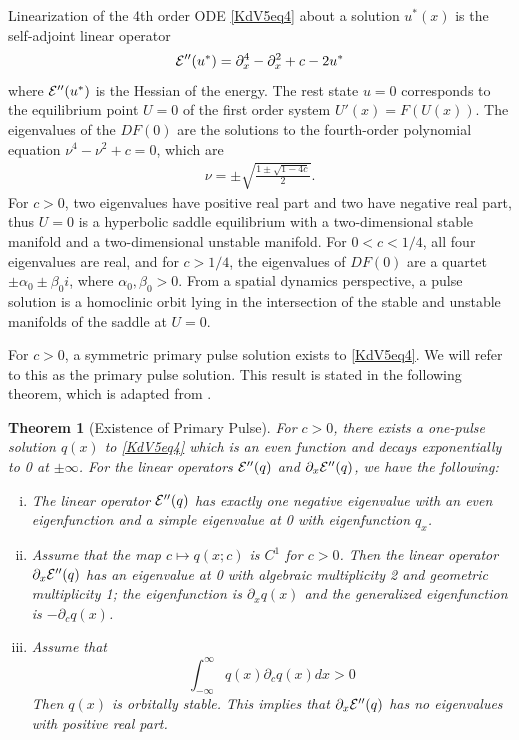 \documentclass[11pt,reqno]{amsart}
\theoremstyle{plain}
\newtheorem{theorem}{Theorem}
\theoremstyle{definition}
\theoremstyle{remark}
\begin{document}
Linearization of the 4th order ODE \cref{KdV5eq4} about a solution $u^*(x)$ is the self-adjoint linear operator
\begin{equation}\label{KdV5hessian}
\mathcal{E}''(u^*) = \partial_x^4 - \partial_x^2 + c - 2 u^* 
\end{equation}
where $\mathcal{E}''(u^*)$ is the Hessian of the energy. The rest state $u = 0$ corresponds to the equilibrium point $U = 0$ of the first order system $U'(x) = F(U(x))$. The eigenvalues of the $DF(0)$ are the solutions to the fourth-order polynomial equation $\nu^4 - \nu^2 + c = 0$, which are
\begin{align}
\nu = \pm \sqrt{ \frac{1 \pm \sqrt{1 - 4c} }{2}}.
\end{align}
For $c > 0$, two eigenvalues have positive real part and two have negative real part, thus $U = 0$ is a hyperbolic saddle equilibrium with a two-dimensional stable manifold and a two-dimensional unstable manifold. For $0 < c < 1/4$, all four eigenvalues are real, and for $c > 1/4$, the eigenvalues of $DF(0)$ are a quartet $\pm \alpha_0 \pm \beta_0 i$, where $\alpha_0, \beta_0 > 0$. From a spatial dynamics perspective, a pulse solution is a homoclinic orbit lying in the intersection of the stable and unstable manifolds of the saddle at $U = 0$.

For $c > 0$, a symmetric primary pulse solution exists to \cref{KdV5eq4}. We will refer to this as the primary pulse solution. This result is stated in the following theorem, which is adapted from \cite[Theorem 2.1]{Pelinovsky2007}.

\begin{theorem}[Existence of Primary Pulse]\label{KdV1pulse}
For $c > 0$, there exists a one-pulse solution $q(x)$ to \cref{KdV5eq4} which is an even function and decays exponentially to 0 at $\pm \infty$. For the linear operators $\mathcal{E}''(q)$ and $\partial_x \mathcal{E}''(q)$, we have the following:
\begin{enumerate}[(i)]
\item The linear operator $\mathcal{E}''(q)$ has exactly one negative eigenvalue with an even eigenfunction and a simple eigenvalue at 0 with eigenfunction $q_x$.
\item Assume that the map $c \mapsto q(x; c)$ is $C^1$ for $c > 0$. Then the linear operator $\partial_x \mathcal{E}''(q)$ has an eigenvalue at 0 with algebraic multiplicity 2 and geometric multiplicity 1; the eigenfunction is $\partial_x q(x)$ and the generalized eigenfunction is $-\partial_c q(x)$. 
\item Assume that 
\begin{equation}\label{KdV5stabhyp}
\int_{-\infty}^\infty q(x) \partial_c q(x) dx > 0
\end{equation}
Then $q(x)$ is orbitally stable. This implies that $\partial_x \mathcal{E}''(q)$ has no eigenvalues with positive real part.
\end{enumerate}
\end{theorem}
\end{document}
